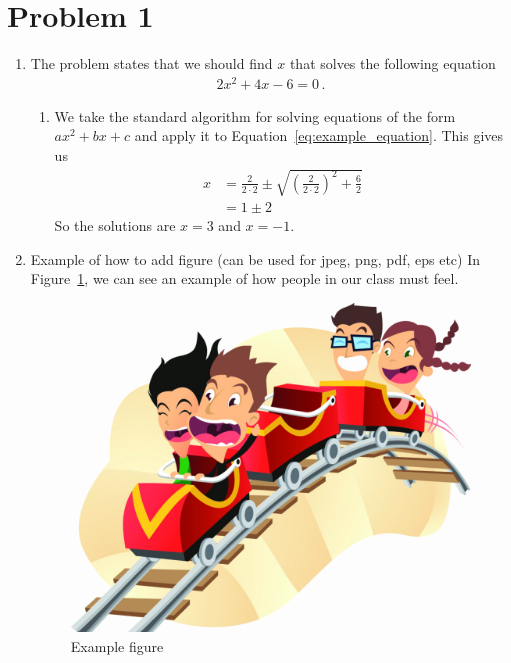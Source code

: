 \documentclass{article}
\begin{document}
\section*{Problem 1}
\begin{enumerate}[label = (\alph*)]
    \item The problem states that we should find $x$ that solves the following equation
\begin{align}
    \label{eq:example_equation} %
    2 x^2 + 4 x - 6 = 0 \,.
\end{align}
\begin{enumerate}[label = (\roman*)]
    \item We take the standard algorithm for solving equations of the form $a x^2 + bx + c$ and apply it to Equation~\ref{eq:example_equation}. This gives us
\begin{align}
    x 
    &= \frac{2}{2 \cdot 2} \pm \sqrt{\left( \frac{2}{2 \cdot 2} \right)^2 + \frac{6}{2} } \\
    &= 1 \pm 2
\end{align}
So the solutions are $x=3$ and $x = -1$.
\end{enumerate}
\item Example of how to add figure (can be used for jpeg, png, pdf, eps etc)
In Figure~\ref{fig:roller-coaster}, we can see an example of how people in our class must feel.
\begin{figure}[h!]
    \centering
    \includegraphics[scale=0.2]{figures/roller-coaster.png}
    \caption{Example figure}
    \label{fig:roller-coaster}
\end{figure}
\end{enumerate}
\end{document}
